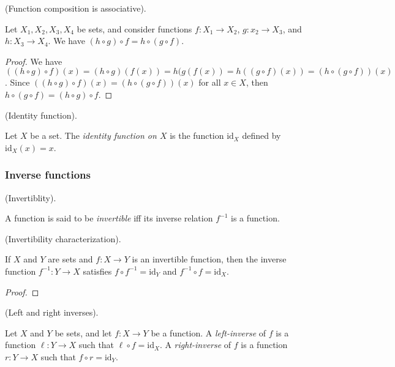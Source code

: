 \begin{theorem}
    (Function composition is associative).

    Let $X_1, X_2, X_3, X_4$ be sets, and consider functions $f:X_1 \rightarrow X_2$, $g:x_2 \rightarrow X_3$, and $h:X_3 \rightarrow X_4$. We have $(h \circ g) \circ f = h \circ (g \circ f)$.
\end{theorem}

\begin{proof}
    We have $((h \circ g) \circ f)(x) = (h \circ g)(f(x)) = h(g(f(x)) = h((g \circ f)(x)) = (h \circ (g \circ f))(x)$. Since $((h \circ g) \circ f)(x) = (h \circ (g \circ f))(x)$ for all $x \in X$, then $h \circ (g \circ f) = (h \circ g) \circ f$. 
\end{proof}

\begin{defn}
    (Identity function).

    Let $X$ be a set. The \textit{identity function on $X$} is the function $\text{id}_X$ defined by $\text{id}_X(x) = x$.
\end{defn}

\subsubsection*{Inverse functions}

\begin{defn}
\label{ch::logic_pf_fns::defn::inverse_fn}
    (Invertiblity).

    A function is said to be \textit{invertible} iff its inverse relation $f^{-1}$ is a function.
\end{defn}

\begin{theorem}
    (Invertibility characterization).

    If $X$ and $Y$ are sets and $f:X \rightarrow Y$ is an invertible function, then the inverse function $f^{-1}:Y \rightarrow X$ satisfies $f \circ f^{-1} = \text{id}_Y$ and $f^{-1} \circ f = \text{id}_X$.
\end{theorem}

\begin{proof}
    
\end{proof}

\begin{defn}
    (Left and right inverses).

    Let $X$ and $Y$ be sets, and let $f:X \rightarrow Y$ be a function. A \textit{left-inverse} of $f$ is a function $\ell:Y \rightarrow X$ such that $\ell \circ f = \text{id}_X$. A \textit{right-inverse} of $f$ is a function $r:Y \rightarrow X$ such that $f \circ r = \text{id}_Y$.
\end{defn}

